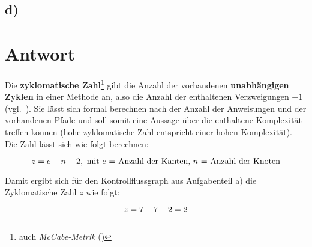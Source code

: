 \subsection*{d)}

\section*{Antwort}
Die \textbf{zyklomatische Zahl}\footnote{
    auch \textit{McCabe-Metrik} (\cite{McC76})
} gibt die Anzahl der vorhandenen \textbf{unabhängigen Zyklen} in einer Methode an, also die Anzahl der enthaltenen Verzweigungen $+1$ (vgl.~\cite[38]{Wed09c}).
Sie lässt sich formal berechnen nach der Anzahl der Anweisungen und der vorhandenen Pfade und soll somit eine Aussage über die enthaltene Komplexität treffen können (hohe zyklomatische Zahl entspricht einer hohen Komplexität).\\
Die Zahl lässt sich wie folgt berechnen:

\begin{equation}\notag
    z = e - n + 2, \text{ mit $e$ = Anzahl der Kanten, $n$ = Anzahl der Knoten}
\end{equation}

\noindent
Damit ergibt sich für den Kontrollflussgraph aus Aufgabenteil a) die Zyklomatische Zahl $z$ wie folgt:

\begin{equation}\notag
    z = 7 - 7 + 2 = 2
\end{equation}